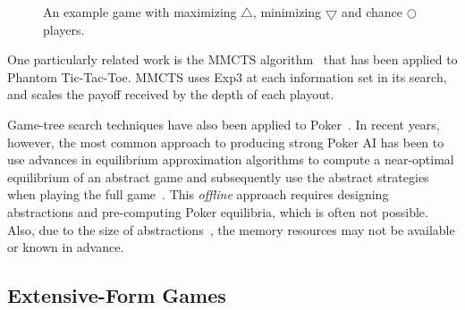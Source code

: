 \documentclass[letterpaper]{article}
\begin{document}
\begin{figure}
\begin{center}
\end{center}
\caption{An example game with maximizing $\bigtriangleup$, minimizing $\bigtriangledown$ and chance $\bigcirc$ players.}\label{fig:coordGame}
\end{figure}


One particularly related work is the MMCTS algorithm~\cite{Auger11Multiple} that has been 
applied to Phantom Tic-Tac-Toe. 
MMCTS uses Exp3 at each information set in its search, and scales the payoff 
received by the depth of each playout. 


Game-tree search techniques have also been applied to Poker~\cite{Billings04Game}. In recent years, however, 
the most common approach to producing strong Poker AI has been to use advances in equilibrium approximation 
algorithms to compute a near-optimal equilibrium of an abstract game and subsequently use the abstract strategies 
when playing the full game~\cite{Sandholm10The}. This {\it offline} approach requires designing 
abstractions and pre-computing Poker equilibria, which is often not possible. Also, due to the size of 
abstractions~\cite{Johanson13Evaluating}, the memory resources may not be available or known in advance. 

\subsection{Extensive-Form Games}

\end{document}
